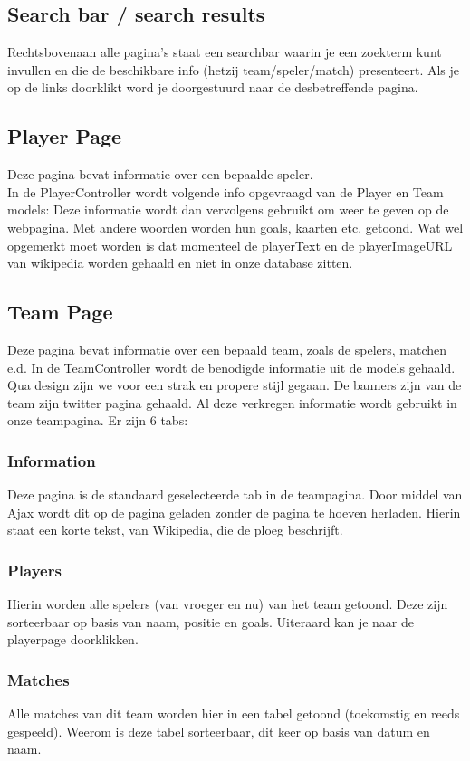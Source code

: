 \documentclass[11pt, a4paper]{article}
\begin{document}
\subsection{Search bar / search results}
Rechtsbovenaan alle pagina's staat een searchbar waarin je een zoekterm kunt invullen en die de beschikbare info (hetzij team/speler/match) presenteert. Als je op de links doorklikt word je doorgestuurd naar de desbetreffende pagina.

\subsection{Player Page}
Deze pagina bevat informatie over een bepaalde speler.
\\
In de PlayerController wordt volgende info opgevraagd van de Player en Team models:
Deze informatie wordt dan vervolgens gebruikt om weer te geven op de webpagina. Met andere woorden worden hun goals, kaarten etc. getoond. Wat wel opgemerkt moet worden is dat momenteel de playerText en de playerImageURL van wikipedia worden gehaald en niet
in onze database zitten.

\subsection{Team Page}
Deze pagina bevat informatie over een bepaald team, zoals de spelers, matchen e.d.
In de TeamController wordt de benodigde informatie uit de models gehaald.
Qua design zijn we voor een strak en propere stijl gegaan. De banners zijn van de team zijn twitter pagina gehaald.
Al deze verkregen informatie wordt gebruikt in onze teampagina. Er zijn 6 tabs:
\subsubsection{Information}
Deze pagina is de standaard geselecteerde tab in de teampagina. Door middel van Ajax wordt dit op de pagina geladen zonder de pagina te hoeven herladen.
Hierin staat een korte tekst, van Wikipedia, die de ploeg beschrijft.
\subsubsection{Players}
Hierin worden alle spelers (van vroeger en nu) van het team getoond. Deze zijn sorteerbaar op basis van naam, positie en goals. Uiteraard kan je naar de playerpage doorklikken.
\subsubsection{Matches}
Alle matches van dit team worden hier in een tabel getoond (toekomstig en reeds gespeeld). Weerom is deze tabel sorteerbaar, dit keer op basis van datum en naam.
\end{document}
